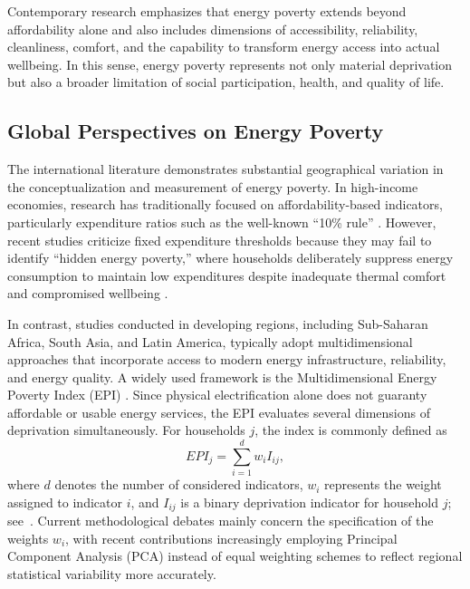 \documentclass[11pt,a4paper]{article}
\begin{document}
Contemporary research emphasizes that energy poverty extends beyond affordability alone and also includes dimensions of accessibility, reliability, cleanliness, comfort, and the capability to transform energy access into actual wellbeing. In this sense, energy poverty represents not only material deprivation but also a broader limitation of social participation, health, and quality of life.

\subsection{Global Perspectives on Energy Poverty}

The international literature demonstrates substantial geographical variation in the conceptualization and measurement of energy poverty. In high-income economies, research has traditionally focused on affordability-based indicators, particularly expenditure ratios such as the well-known ``10\% rule'' \cite{garcia2019spain,dubois2020france}. However, recent studies criticize fixed expenditure thresholds because they may fail to identify ``hidden energy poverty,'' where households deliberately suppress energy consumption to maintain low expenditures despite inadequate thermal comfort and compromised wellbeing \cite{smith2022hidden,van2021dutchpoverty}.

In contrast, studies conducted in developing regions, including Sub-Saharan Africa, South Asia, and Latin America, typically adopt multidimensional approaches that incorporate access to modern energy infrastructure, reliability, and energy quality. A widely used framework is the Multidimensional Energy Poverty Index (EPI) \cite{nussbaumer2012mepi,patel2021southasia,silva2020latam}. Since physical electrification alone does not guaranty affordable or usable energy services, the EPI evaluates several dimensions of deprivation simultaneously. For households $j$, the index is commonly defined as
\begin{equation}\label{eq:mepi}
EPI_j = \sum_{i=1}^{d} w_i I_{ij},
\end{equation}
where $d$ denotes the number of considered indicators, $w_i$ represents the weight assigned to indicator $i$, and $I_{ij}$ is a binary deprivation indicator for household $j$; see~\cite{moyo2022subsaharan}. Current methodological debates mainly concern the specification of the weights $w_i$, with recent contributions increasingly employing Principal Component Analysis (PCA) instead of equal weighting schemes to reflect regional statistical variability more accurately.
\end{document}
